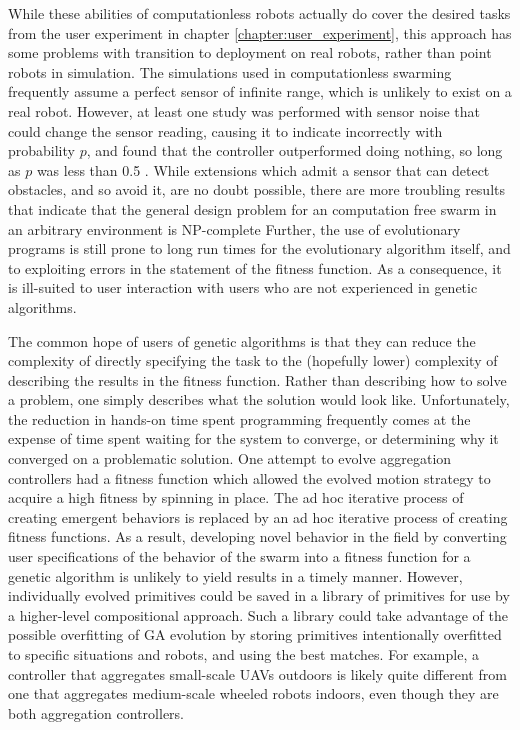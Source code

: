 While these abilities of computationless robots actually do cover the desired tasks from the user experiment in chapter \ref{chapter:user_experiment}, this approach has some problems with transition to deployment on real robots, rather than point robots in simulation. 
The simulations used in computationless swarming frequently assume a perfect sensor of infinite range, which is unlikely to exist on a real robot.
However, at least one study was performed with sensor noise that could change the sensor reading, causing it to indicate incorrectly with probability $p$, and found that the controller outperformed doing nothing, so long as $p$ was less than 0.5 \citep{gauci2014self}. 
While extensions which admit a sensor that can detect obstacles, and so avoid it, are no doubt possible, there are more troubling results that indicate that the general design problem for an computation free swarm in an arbitrary environment is NP-complete \citep{wareham2018viable}
Further, the use of evolutionary programs is still prone to long run times for the evolutionary algorithm itself, and to exploiting errors in the statement of the fitness function. 
As a consequence, it is ill-suited to user interaction with users who are not experienced in genetic algorithms. 

The common hope of users of genetic algorithms is that they can reduce the complexity of directly specifying the task to the (hopefully lower) complexity of describing the results in the fitness function.
Rather than describing how to solve a problem, one simply describes what the solution would look like. 
Unfortunately, the reduction in hands-on time spent programming frequently comes at the expense of time spent waiting for the system to converge, or determining why it converged on a problematic solution. 
One attempt to evolve aggregation controllers had a fitness function which allowed the evolved motion strategy to acquire a high fitness by spinning in place.
The ad hoc iterative process of creating emergent behaviors is replaced by an ad hoc iterative process of creating fitness functions.
As a result, developing novel behavior in the field by converting user specifications of the behavior of the swarm into a fitness function for a genetic algorithm is unlikely to yield results in a timely manner. 
However, individually evolved primitives could be saved in a library of primitives for use by a higher-level compositional approach. 
Such a library could take advantage of the possible overfitting of GA evolution by storing primitives intentionally overfitted to specific situations and robots, and using the best matches. 
For example, a controller that aggregates small-scale UAVs outdoors is likely quite different from one that aggregates medium-scale wheeled robots indoors, even though they are both aggregation controllers. 

